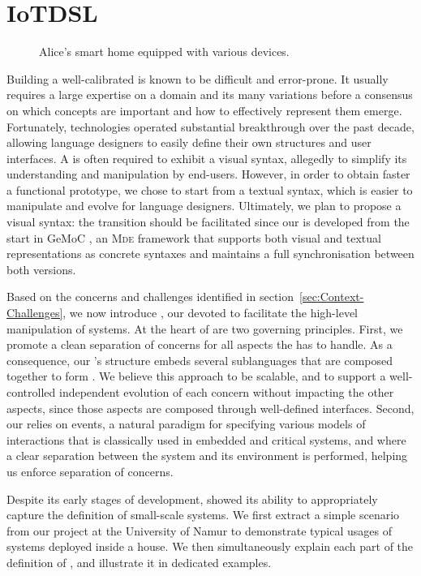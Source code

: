 \section{IoTDSL}
\label{sec:IoTDSL}

\begin{figure*}%
\caption{Alice's smart home equipped with various devices.}%
\label{fig:RE}%
\end{figure*}

Building a well-calibrated \DSL is known to be difficult and error-prone. It usually requires a large expertise on a domain and its many variations before a consensus on which concepts are important and how to effectively represent them emerge. Fortunately, \MDE technologies operated substantial breakthrough over the past decade, allowing language designers to easily define their own \DSL structures and user interfaces. A \DSL is often required to exhibit a visual syntax, allegedly to simplify its understanding and manipulation by end-users. However, in order to obtain faster a functional prototype, we chose to start from a textual syntax, which is easier to manipulate and evolve for language designers. Ultimately, we plan to propose a visual syntax: the transition should be facilitated since our \DSL is developed from the start in GeMoC \cite{combemale-14}, an \textsc{Mde} framework that supports both visual and textual representations as concrete syntaxes and maintains a full synchronisation between both versions.

Based on the concerns and challenges identified in section~\ref{sec:Context-Challenges}, we now introduce \IOTDSL, our \DSL devoted to facilitate the high-level manipulation of \IOT systems. At the heart of \IOTDSL are two governing principles. First, we promote a clean separation of concerns for all aspects the \DSL has to handle. As a consequence, our \DSL's structure embeds several sublanguages that are composed together to form \IOTDSL. We believe this approach to be scalable, and to support a well-controlled independent evolution of each concern without impacting the other aspects, since those aspects are composed through well-defined interfaces. Second, our \DSL relies on events, a natural paradigm for specifying various models of interactions that is classically used in embedded and critical systems, and where a clear separation between the system and its environment is performed, helping us enforce separation of concerns.

Despite its early stages of development, \IOTDSL showed its ability to appropriately capture the definition of small-scale \IOT systems. We first extract a simple scenario from our project at the University of Namur to demonstrate typical usages of \IOT systems deployed inside a house. We then simultaneously explain each part of the definition of \IOTDSL, and illustrate it in dedicated examples.


